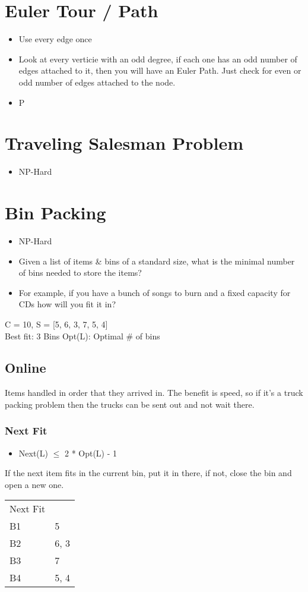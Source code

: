 \documentclass{article}
\begin{document}
\section{Euler Tour / Path}
\label{sec:orgbd87bc4}
\begin{itemize}
\item Use every edge once
\item Look at every verticie with an odd degree, if each one has an odd number of edges attached to it, then you will have an Euler Path. Just check for even or odd number of edges attached to the node.
\item P
\end{itemize}

\section{Traveling Salesman Problem}
\label{sec:org639ac7f}
\begin{itemize}
\item NP-Hard
\end{itemize}

\section{Bin Packing}
\label{sec:orgffe78f0}
\begin{itemize}
\item NP-Hard
\item Given a list of items \& bins of a standard size, what is the minimal number of bins needed to store the items?
\item For example, if you have a bunch of songs to burn and a fixed capacity for CDs how will you fit it in?
\end{itemize}

C = 10, S = [5, 6, 3, 7, 5, 4] \\
Best fit: 3 Bins
Opt(L): Optimal \# of bins

\subsection{Online}
\label{sec:org25a706d}
Items handled in order that they arrived in. The benefit is speed, so if it's a truck packing problem then the trucks can be sent out and not wait there.
\subsubsection{Next Fit}
\label{sec:org1137453}
\begin{itemize}
\item Next(L) \(\leq\) 2 * Opt(L) - 1
\end{itemize}
If the next item fits in the current bin, put it in there, if not, close the bin and open a new one.
\begin{center}
\begin{tabular}{ll}
Next Fit & \\
B1 & 5\\
B2 & 6, 3\\
B3 & 7\\
B4 & 5, 4\\
\end{tabular}
\end{center}
\end{document}
